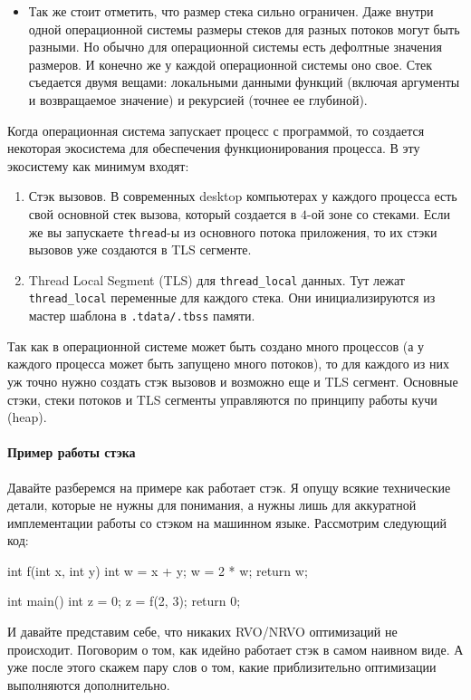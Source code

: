 \documentclass{article}
\begin{document}
\begin{itemize}
\item Так же стоит отметить, что размер стека сильно ограничен.
Даже внутри одной операционной системы размеры стеков для разных потоков могут быть разными.
Но обычно для операционной системы есть дефолтные значения размеров.
И конечно же у каждой операционной системы оно свое.
Стек съедается двумя вещами: локальными данными функций (включая аргументы и возвращаемое значение) и рекурсией (точнее ее глубиной).
\end{itemize}

Когда операционная система запускает процесс с программой, то создается некоторая экосистема для обеспечения функционирования процесса.
В эту экосистему как минимум входят:
\begin{enumerate}
\item Стэк вызовов.
В современных desktop компьютерах у каждого процесса есть свой основной стек вызова, который создается в $4$-ой зоне со стеками.
Если же вы запускаете \verb"thread"-ы из основного потока приложения, то их стэки вызовов уже создаются в TLS сегменте.

\item Thread Local Segment (TLS) для \verb"thread_local" данных.
Тут лежат \verb"thread_local" переменные для каждого стека.
Они инициализируются из мастер шаблона в \verb".tdata/.tbss" памяти.
\end{enumerate}
Так как в операционной системе может быть создано много процессов (а у каждого процесса может быть запущено много потоков), то для каждого из них уж точно нужно создать стэк вызовов и возможно еще и TLS сегмент.
Основные стэки, стеки потоков и TLS сегменты управляются по принципу работы кучи (heap).

\paragraph{Пример работы стэка}

Давайте разберемся на примере как работает стэк.
Я опущу всякие технические детали, которые не нужны для понимания, а нужны лишь для аккуратной имплементации работы со стэком на машинном языке.
Рассмотрим следующий код:
\begin{cppcode}
int f(int x, int y) {
  int w = x + y;
  w = 2 * w;
  return w;
}

int main() {
  int z = 0;
  z = f(2, 3);
  return 0;
}
\end{cppcode}
И давайте представим себе, что никаких RVO/NRVO оптимизаций не происходит.
Поговорим о том, как идейно работает стэк в самом наивном виде.
А уже после этого скажем пару слов о том, какие приблизительно оптимизации выполняются дополнительно.
\end{document}

